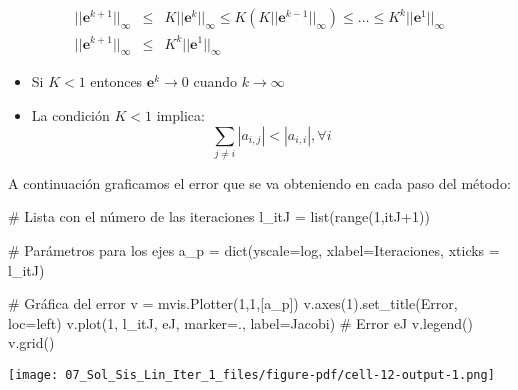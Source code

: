 \documentclass[
  letterpaper,
  DIV=11,
  numbers=noendperiod]{scrreprt}
\newenvironment{Shaded}{\begin{snugshade}}{\end{snugshade}}
\newcommand{\BuiltInTok}[1]{\textcolor[rgb]{0.00,0.23,0.31}{#1}}
\newcommand{\CommentTok}[1]{\textcolor[rgb]{0.37,0.37,0.37}{#1}}
\newcommand{\DecValTok}[1]{\textcolor[rgb]{0.68,0.00,0.00}{#1}}
\newcommand{\NormalTok}[1]{\textcolor[rgb]{0.00,0.23,0.31}{#1}}
\newcommand{\OperatorTok}[1]{\textcolor[rgb]{0.37,0.37,0.37}{#1}}
\newcommand{\StringTok}[1]{\textcolor[rgb]{0.13,0.47,0.30}{#1}}
\begin{document}
\[
\begin{eqnarray*}
|| \mathbf{e}^{k+1} ||_\infty & \le &  K || \mathbf{e}^{k} ||_\infty \le K \left( K || \mathbf{e}^{k-1} ||_\infty \right) \le
\dots \le K^k || \mathbf{e}^{1} ||_\infty \\
|| \mathbf{e}^{k+1} ||_\infty & \le &  K^k || \mathbf{e}^{1} ||_\infty
\end{eqnarray*}
\]

\begin{itemize}
\item
  Si \(K < 1\) entonces \(\mathbf{e}^{k} \rightarrow 0\) cuando
  \(k \rightarrow \infty\)
\item
  La condición \(K < 1\) implica: \[
  \sum_{j \neq i} |a_{i,j}| < |a_{i,i}|, \forall i
  \]
\end{itemize}

A continuación graficamos el error que se va obteniendo en cada paso del
método:

\begin{Shaded}
\begin{Highlighting}[]
\CommentTok{\# Lista con el número de las iteraciones}
\NormalTok{l\_itJ }\OperatorTok{=} \BuiltInTok{list}\NormalTok{(}\BuiltInTok{range}\NormalTok{(}\DecValTok{1}\NormalTok{,itJ}\OperatorTok{+}\DecValTok{1}\NormalTok{)) }

\CommentTok{\# Parámetros para los ejes}
\NormalTok{a\_p }\OperatorTok{=} \BuiltInTok{dict}\NormalTok{(yscale}\OperatorTok{=}\StringTok{\textquotesingle{}log\textquotesingle{}}\NormalTok{, xlabel}\OperatorTok{=}\StringTok{\textquotesingle{}Iteraciones\textquotesingle{}}\NormalTok{, xticks }\OperatorTok{=}\NormalTok{ l\_itJ)}

\CommentTok{\# Gráfica del error}
\NormalTok{v }\OperatorTok{=}\NormalTok{ mvis.Plotter(}\DecValTok{1}\NormalTok{,}\DecValTok{1}\NormalTok{,[a\_p]) }
\NormalTok{v.axes(}\DecValTok{1}\NormalTok{).set\_title(}\StringTok{\textquotesingle{}Error\textquotesingle{}}\NormalTok{, loc}\OperatorTok{=}\StringTok{\textquotesingle{}left\textquotesingle{}}\NormalTok{)}
\NormalTok{v.plot(}\DecValTok{1}\NormalTok{, l\_itJ, eJ, marker}\OperatorTok{=}\StringTok{\textquotesingle{}.\textquotesingle{}}\NormalTok{, label}\OperatorTok{=}\StringTok{\textquotesingle{}Jacobi\textquotesingle{}}\NormalTok{) }\CommentTok{\# Error eJ}
\NormalTok{v.legend()}
\NormalTok{v.grid()}
\end{Highlighting}
\end{Shaded}

\texttt{[image: 07\_Sol\_Sis\_Lin\_Iter\_1\_files/figure-pdf/cell-12-output-1.png]}
\end{document}

